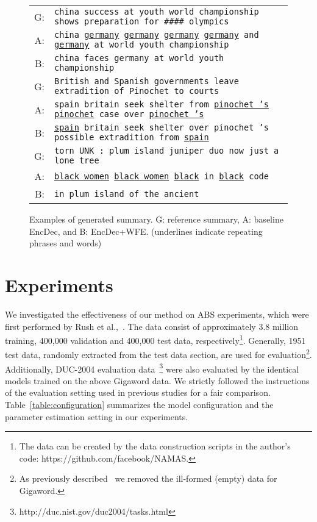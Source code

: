 \documentclass[11pt]{article}
\begin{document}
\begin{figure}[t]
 \centering
 \tabcolsep=1pt
 \small
 \begin{tabular}{rp{71mm}}
  \hline
  G: & {\tt china success at youth world championship shows preparation for \#\#\#\# olympics}\\
  A: & {\tt china \underline{germany} \underline{germany} \underline{germany} \underline{germany} and \underline{germany} at world youth championship}\\
  B: & {\tt china faces germany at world youth championship}\\
  \hline
  G:& {\tt British and Spanish governments leave extradition of Pinochet to courts}\\
  A:& {\tt spain britain seek shelter from \underline{pinochet 's} \underline{pinochet} case over \underline{pinochet 's}}\\
  B:& {\tt \underline{spain} britain seek shelter over pinochet 's possible extradition from \underline{spain}}\\
  \hline
  G:& {\tt torn UNK : plum island juniper duo now just a lone tree}\\
  A:& {\tt \underline{black women} \underline{black women} \underline{black} in \underline{black} code}\\
  B:& {\tt in plum island of the ancient}\\
  \hline
 \end{tabular}
 \caption{Examples of generated summary. G: reference summary, A: baseline EncDec, and B: EncDec+WFE. (underlines indicate repeating phrases and words)}
 \label{fig:raw_generation}
\end{figure}
\section{Experiments}
\label{sec:experiments}
   We investigated the effectiveness of our method on ABS experiments, which were first performed by Rush et al.,~.
   The data consist of approximately 3.8 million training, 400,000 validation and 400,000 test data, respectively\footnote{The data can be created by the data construction scripts in the author's code: {{https://github.com/facebook/NAMAS}}.}.
   Generally, 1951 test data, randomly extracted from the test data section, are used for evaluation\footnote{As previously described~\cite{chopra-auli-rush:2016:N16-1} we removed the ill-formed (empty) data for Gigaword.}.
   Additionally, DUC-2004 evaluation data~\cite{Over:2007:DC:1284916.1285157}\footnote{http://duc.nist.gov/duc2004/tasks.html} were also evaluated by the identical models trained on the above Gigaword data. 
    We strictly followed the instructions of the evaluation setting used in previous studies for a fair comparison.
   Table~\ref{table:configuration} summarizes the model configuration and the parameter estimation setting in our experiments.
\end{document}
